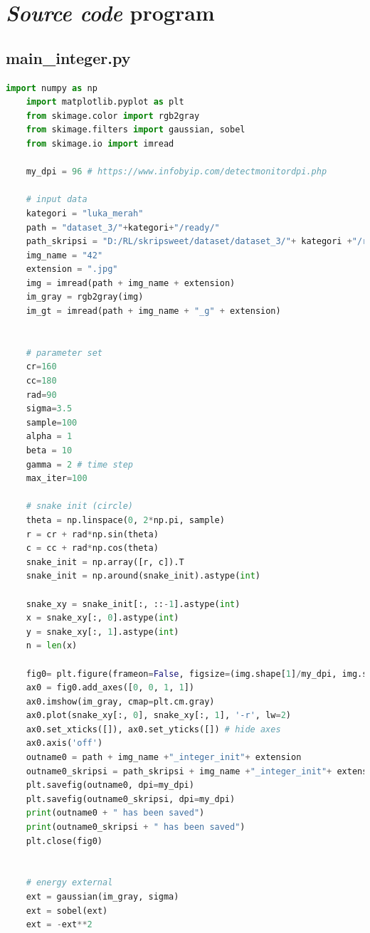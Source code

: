 \appendix


\chapter{\emph{Source code} program}

\section{main\_integer.py }

\begin{lstlisting}[language=Python, basicstyle=\tiny]
	import numpy as np
	import matplotlib.pyplot as plt
	from skimage.color import rgb2gray
	from skimage.filters import gaussian, sobel
	from skimage.io import imread
	
	my_dpi = 96 # https://www.infobyip.com/detectmonitordpi.php
	
	# input data
	kategori = "luka_merah"
	path = "dataset_3/"+kategori+"/ready/"
	path_skripsi = "D:/RL/skripsweet/dataset/dataset_3/"+ kategori +"/ready/"
	img_name = "42"
	extension = ".jpg"
	img = imread(path + img_name + extension)
	im_gray = rgb2gray(img)
	im_gt = imread(path + img_name + "_g" + extension)
	
	
	# parameter set
	cr=160
	cc=180
	rad=90
	sigma=3.5
	sample=100
	alpha = 1
	beta = 10
	gamma = 2 # time step
	max_iter=100
	
	# snake init (circle)
	theta = np.linspace(0, 2*np.pi, sample)
	r = cr + rad*np.sin(theta)
	c = cc + rad*np.cos(theta)
	snake_init = np.array([r, c]).T
	snake_init = np.around(snake_init).astype(int)
	
	snake_xy = snake_init[:, ::-1].astype(int)
	x = snake_xy[:, 0].astype(int)
	y = snake_xy[:, 1].astype(int)
	n = len(x)
	
	fig0= plt.figure(frameon=False, figsize=(img.shape[1]/my_dpi, img.shape[0]/my_dpi), dpi=my_dpi)
	ax0 = fig0.add_axes([0, 0, 1, 1])
	ax0.imshow(im_gray, cmap=plt.cm.gray)
	ax0.plot(snake_xy[:, 0], snake_xy[:, 1], '-r', lw=2)
	ax0.set_xticks([]), ax0.set_yticks([]) # hide axes
	ax0.axis('off')
	outname0 = path + img_name +"_integer_init"+ extension
	outname0_skripsi = path_skripsi + img_name +"_integer_init"+ extension
	plt.savefig(outname0, dpi=my_dpi)
	plt.savefig(outname0_skripsi, dpi=my_dpi)
	print(outname0 + " has been saved")
	print(outname0_skripsi + " has been saved")
	plt.close(fig0)
	
	
	# energy external
	ext = gaussian(im_gray, sigma)
	ext = sobel(ext)
	ext = -ext**2
	

\end{lstlisting}
